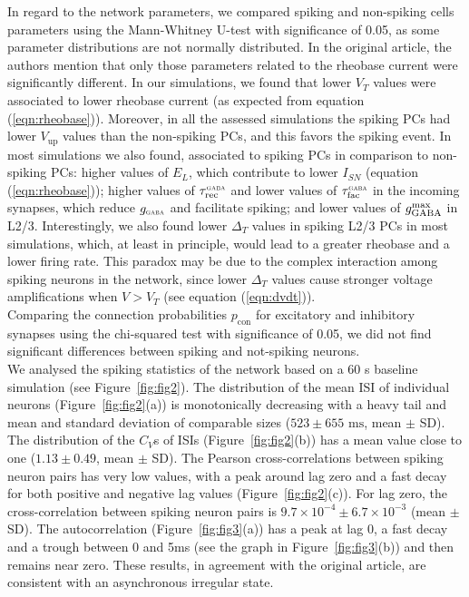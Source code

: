 In regard to the network parameters, we compared spiking and non-spiking cells parameters using the Mann-Whitney U-test with significance of 0.05, as some parameter distributions are not normally distributed. In the original article, the authors mention that only those parameters related to the rheobase current were significantly different. In our simulations, we found that lower $V_T$ values were associated to lower rheobase current (as expected from equation (\ref{eqn:rheobase})). Moreover, in all the assessed simulations the spiking PCs had lower $V_{\text{up}}$ values than the non-spiking PCs, and this favors the spiking event. In most simulations we also found, associated to spiking PCs in comparison to non-spiking PCs: higher values of $E_L$, which contribute to lower $I_{SN}$ (equation (\ref{eqn:rheobase})); higher values of $\tau_{\text{rec}}^{\scaleto{\text{GABA}}{3pt}}$ and lower values of $\tau_{\text{fac}}^{\scaleto{\text{GABA}}{3pt}}$ in the incoming synapses, which reduce $g_{\scaleto{\text{GABA}}{3pt}}$ and facilitate spiking; and lower values of $g_{\text{GABA}}^{\scaleto{\text{max}}{3pt}}$ in L2/3. Interestingly, we also found lower $\Delta_T$ values in spiking L2/3 PCs in most simulations, which, at least in principle, would lead to a greater rheobase and a lower firing rate. This paradox may be due to the complex interaction among spiking neurons in the network, since lower $\Delta_T$ values cause stronger voltage amplifications when $V > V_T$ (see equation (\ref{eqn:dvdt})).\\

Comparing the connection probabilities $p_{\text{con}}$ for excitatory and inhibitory synapses using the chi-squared test with significance of 0.05, we did not find significant differences between spiking and not-spiking neurons.\\

We analysed the spiking statistics of the network based on a 60 s baseline simulation (see Figure~\ref{fig:fig2}). The distribution of the mean ISI of individual neurons (Figure~\ref{fig:fig2}(a)) is monotonically decreasing with a heavy tail and mean and standard deviation of comparable sizes ($523 \pm 655 \text{ ms}$, mean $\pm$ SD). The distribution of the $C_V$s of ISIs (Figure~\ref{fig:fig2}(b)) has a mean value close to one ($1.13 \pm 0.49$, mean $\pm$ SD). The Pearson cross-correlations between spiking neuron pairs has very low values, with a peak around lag zero and a fast decay for both positive and negative lag values (Figure~\ref{fig:fig2}(c)). For lag zero, the cross-correlation between spiking neuron pairs is $9.7 \times 10^{-4} \pm 6.7 \times 10^{-3}$ (mean $\pm$ SD). The autocorrelation (Figure~\ref{fig:fig3}(a)) has a peak at lag 0, a fast decay and a trough between 0 and 5ms (see the graph in Figure~\ref{fig:fig3}(b)) and then remains near zero.  These results, in agreement with the original article, are consistent with an asynchronous irregular state.\\

